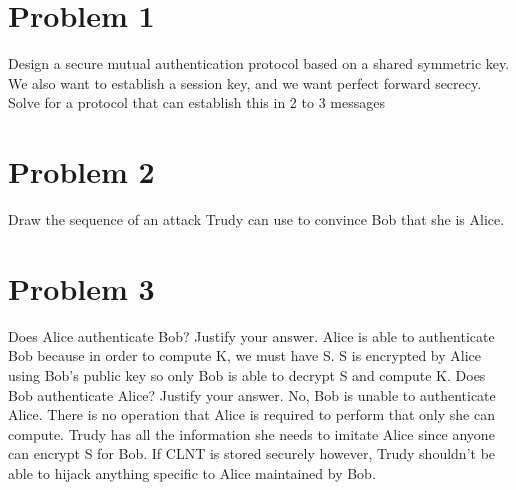 \documentclass{article}
\newenvironment{problem}[1]{
  \nobreak\section*{Problem #1}
}{}
\begin{document}
  \begin{problem}{1}
    Design a secure mutual authentication protocol based on a shared 
    symmetric key.  We also want to establish a session key, and we 
    want perfect forward secrecy.  Solve for a protocol that can 
    establish this in 2 to 3 messages

    \begin{center}
    \end{center}
  \end{problem}

  \begin{problem}{2}
    Draw the sequence of an attack Trudy can use to convince Bob that 
    she is Alice.

    \begin{center}
    \end{center}
  \end{problem}

  \begin{problem}{3}
    Does Alice authenticate Bob?  Justify your answer.
    \bigbreak
    Alice is able to authenticate Bob because in order to compute K,
    we must have S.  S is encrypted by Alice using Bob's public key
    so only Bob is able to decrypt S and compute K.
    \bigbreak\noindent
    Does Bob authenticate Alice?  Justify your answer.
    \bigbreak
    No, Bob is unable to authenticate Alice.  There is no operation
    that Alice is required to perform that only she can compute.
    Trudy has all the information she needs to imitate Alice since
    anyone can encrypt S for Bob.  If CLNT is stored securely
    however, Trudy shouldn't be able to hijack anything specific to
    Alice maintained by Bob.
  \end{problem}
\end{document}
